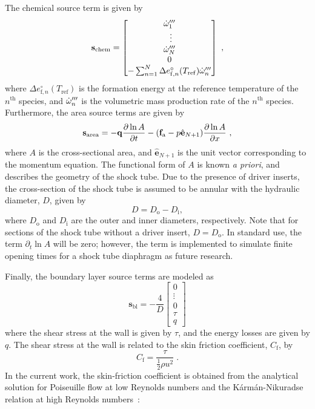 The chemical source term is given by
\begin{equation}
	\mathbf{s}_\mathrm{chem} = \begin{bmatrix}
	\dot{\omega}^{\prime\prime\prime}_1 \\\
	\vdots\\
	\dot{\omega}^{\prime\prime\prime}_N\\
	0\\
	-\sum_{n=1}^N\Delta e_{\mathrm{f},n}^\circ(T_\mathrm{ref})\dot{\omega}^{\prime\prime\prime}_n
	\end{bmatrix}\ ,
\end{equation}
where $\Delta e_{\mathrm{f},n}^\circ(T_\mathrm{ref})$ is the formation energy at the reference temperature  of the $n^\mathrm{th}$ species, and $\dot{\omega}^{\prime\prime\prime}_n$ is the volumetric mass production rate of the $n^\mathrm{th}$ species. Furthermore, the area source terms are given by 
\begin{equation}
\mathbf{s}_\mathrm{area}=
-\mathbf{q}\frac{\p\ln A}{\p t} -(\mathbf{f}_\mathrm{a}-p\hat{\mathbf{e}}_{N+1})\frac{\p\ln A}{\p x}\ ,
\end{equation}
where $A$ is the cross-sectional area, and $\hat{\mathbf{e}}_{N+1}$ is the unit vector corresponding to the momentum equation. The functional form of $A$ is known \emph{a priori}, and describes the geometry of the shock tube. Due to the presence of driver inserts, the cross-section of the shock tube is assumed to be annular with the hydraulic diameter, $D$, given by
\begin{equation}
D=D_\mathrm{o}-D_\mathrm{i} ,
\end{equation}
where $D_\mathrm{o}$ and $D_\mathrm{i}$ are the outer and inner diameters, respectively. Note that for sections of the shock tube without a driver insert, $D=D_\mathrm{o}$. In standard use, the term $\partial_t \ln A$ will be zero; however, the term is implemented to simulate finite opening times for a shock tube diaphragm as future research. 

Finally, the boundary layer source terms are modeled as 
\begin{equation}\label{EQ_BLSRC}
	\mathbf{s}_\mathrm{bl}=-\frac{4}{D}\begin{bmatrix}
		0\\
		\vdots\\
		0\\
		\tau\\
		q
	\end{bmatrix}
\end{equation}
where the shear stress at the wall is given by $\tau$, and the energy losses are given by $q$. The shear stress at the wall is related to the skin friction coefficient, $C_\mathrm{f}$, by
\begin{equation}
\label{EQ_TAU}
C_{\mathrm{f}}=\frac{\tau}{\frac{1}{2}\rho u^{2}}\; .
\end{equation}
In the current work, the skin-friction coefficient is obtained from the analytical solution for Poiseuille flow at low Reynolds numbers and the K\'arm\'an-Nikuradse relation at high Reynolds numbers~\cite{KAYS_BOOK2005}:

